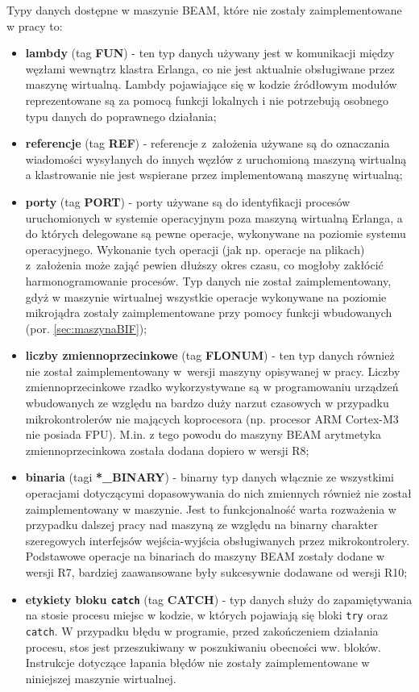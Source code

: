 Typy danych dostępne w maszynie BEAM, które nie zostały zaimplementowane w pracy to:
\begin{itemize}
\item \textbf{lambdy} (tag \textbf{FUN}) - ten typ danych używany jest w komunikacji między węzłami wewnątrz klastra Erlanga, co nie jest aktualnie obsługiwane przez maszynę wirtualną. Lambdy pojawiające się w kodzie źródłowym modułów reprezentowane są za pomocą funkcji lokalnych i nie potrzebują osobnego typu danych do poprawnego działania;
\item \textbf{referencje} (tag \textbf{REF}) - referencje z~założenia używane są do oznaczania wiadomości wysyłanych do innych węzłów z uruchomioną maszyną wirtualną a klastrowanie nie jest wspierane przez implementowaną maszynę wirtualną;
\item \textbf{porty} (tag \textbf{PORT}) - porty używane są do identyfikacji procesów uruchomionych w systemie operacyjnym poza maszyną wirtualną Erlanga, a do których delegowane są pewne operacje, wykonywane na poziomie systemu operacyjnego. Wykonanie tych operacji (jak np. operacje na plikach) z~założenia może zająć pewien dłuższy okres czasu, co mogłoby zakłócić harmonogramowanie procesów. Typ danych nie został zaimplementowany, gdyż w maszynie wirtualnej wszystkie operacje wykonywane na poziomie mikrojądra zostały zaimplementowane przy pomocy funkcji wbudowanych (por. \ref{sec:maszynaBIF});
\item \textbf{liczby zmiennoprzecinkowe} (tag \textbf{FLONUM}) - ten typ danych również nie został zaimplementowany w~wersji maszyny opisywanej w pracy. Liczby zmiennoprzecinkowe rzadko wykorzystywane są w programowaniu urządzeń wbudowanych ze względu na bardzo duży narzut czasowych w przypadku mikrokontrolerów nie mających koprocesora (np. procesor ARM Cortex-M3 nie posiada FPU). M.in. z tego powodu do maszyny BEAM arytmetyka zmiennoprzecinkowa została dodana dopiero w wersji R8;
\item \textbf{binaria} (tagi \textbf{*\_BINARY}) - binarny typ danych włącznie ze wszystkimi operacjami dotyczącymi dopasowywania do nich zmiennych również nie został zaimplementowany w maszynie. Jest to funkcjonalność warta rozważenia w przypadku dalszej pracy nad maszyną ze względu na binarny charakter szeregowych interfejsów wejścia-wyjścia obsługiwanych przez mikrokontrolery. Podstawowe operacje na binariach do maszyny BEAM zostały dodane w wersji R7, bardziej zaawansowane były sukcesywnie dodawane od wersji R10;
\item \textbf{etykiety bloku \texttt{catch}} (tag \textbf{CATCH}) - typ danych służy do zapamiętywania na stosie procesu miejsc w kodzie, w których pojawiają się bloki \texttt{try} oraz \texttt{catch}. W przypadku błędu w programie, przed zakończeniem działania procesu, stos jest przeszukiwany w poszukiwaniu obecności ww. bloków. Instrukcje dotyczące łapania błędów nie zostały zaimplementowane w niniejszej maszynie wirtualnej.
\end{itemize}

